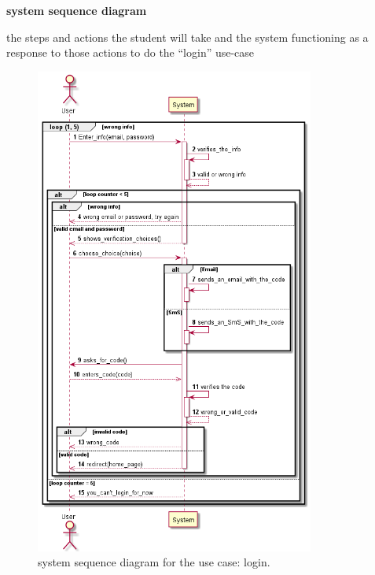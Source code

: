 \documentclass[]{uc2pfecaneva}
\begin{document}
    \raggedright\textbf{system sequence diagram}\linebreak
    \raggedright{the steps and actions the student will take and the system functioning as a response
    to those actions to do the “login” use-case}
    \linebreak
    \begin{figure}[h]
        \includegraphics[width=260pt]{images/Login_dss}
        \caption{system sequence diagram for the use case: login.}
    \end{figure}
    \clearpage
\end{document}
